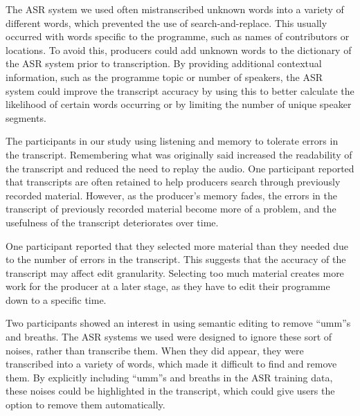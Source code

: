 The ASR system we used often mistranscribed unknown words into a variety of different words, which prevented the use of
search-and-replace.  This usually occurred with words specific to the programme, such as names of contributors or
locations. To avoid this, producers could add unknown words to the dictionary of the ASR system prior to transcription.
By providing additional contextual information, such as the programme topic or number of speakers, the ASR system could
improve the transcript accuracy by using this to better calculate the likelihood of certain words occurring or by
limiting the number of unique speaker segments.

The participants in our study using listening and memory to tolerate errors in the transcript.  Remembering what was
originally said increased the readability of the transcript and reduced the need to replay the audio.  One participant
reported that transcripts are often retained to help producers search through previously recorded material. However, as
the producer's memory fades, the errors in the transcript of previously recorded material become more of a problem, and
the usefulness of the transcript deteriorates over time.

One participant reported that they selected more material than they needed due to the number of errors in the
transcript.  This suggests that the accuracy of the transcript may affect edit granularity.  Selecting too much
material creates more work for the producer at a later stage, as they have to edit their programme down to a
specific time.

Two participants showed an interest in using semantic editing to remove ``umm''s and breaths. The ASR systems we used
were designed to ignore these sort of noises, rather than transcribe them. When they did appear, they were transcribed
into a variety of words, which made it difficult to find and remove them. By explicitly including ``umm''s and breaths
in the ASR training data, these noises could be highlighted in the transcript, which could give users the option to
remove them automatically.


